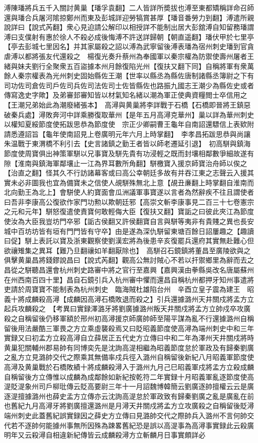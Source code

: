 溥陳璠將兵五千入關討黄巢【璠孚袁翻】二人皆詳所奬拔也溥至東都矯稱詳命召師還與璠合兵屠河隂掠鄭州而東及彭城詳迎勞犒賞甚厚【璠音番勞力到翻】溥遣所親說詳曰【說式芮翻】衆心見迫請公解印以相授詳不能制出居大彭舘溥自知留務璠謂溥曰支僕射有惠於徐人不殺必成後悔溥不許送詳歸朝【朝直遥翻】璠伏甲於七里亭【亭去彭城七里因名】并其家屬殺之詔以溥為武寧留後溥表璠為宿州刺史璠到官貪虐溥以都將張友代還殺之　楊復光奏升蔡州為奉國軍以秦宗權為防禦使壽州屠者王緒與妹夫劉行全聚衆五百盜據本州月餘復陷光州【復扶又翻下同】自稱將軍有衆萬餘人秦宗權表為光州刺史固始縣佐王潮【世率以縣丞為縣佐唐制諸縣丞簿尉之下有司功佐司倉佐司戶佐司兵佐司法佐司士佐皆縣佐也路振九國志王潮少為縣佐史或者傳寫逸史字歟】及弟審邽審知皆以材氣知名緒以潮為軍正使典資糧閲士卒信用之【王潮兄弟始此為潮廢緒張本】　高潯與黄巢將李詳戰于石橋【石橋即晉將王鎮惡破秦兵處】潯敗奔河中詳乘勝復取華州【是年五月高潯克華州】巢以詳為華州刺史　以權知夏綏節度使拓跋思恭為節度使　宗正少卿嗣曹王龜年自南詔還驃信上表欵附請悉遵詔旨【龜年使南詔見上卷廣明元年六月上時掌翻】　李孝昌拓跋思恭與尚讓朱温戰于東渭橋不利引去【史言諸鎮之勤王者皆以師老遷延引退】　初高駢與鎮海節度使周寶俱出神策軍駢以兄事寶及駢先貴有功浸輕之既而封壤相鄰數爭細故遂有隙【淮南與鎮海軍鄰壤止一江為界耳數所角翻】駢檄寶入援京師寶治舟師以俟之【治直之翻】怪其久不行訪諸幕客或曰高公幸朝廷多故有并吞江東之志聲云入援其實未必非圖我也宜為備寶未之信使人覘駢殊無北上意【覘丑亷翻上時掌翻自淮南而北向勤王為北上】會駢使人約寶面會瓜洲議軍事寶遂以言者為然辭疾不往且謂使者曰吾非李康高公復欲作家門功勲以欺朝廷邪【高崇文斬李康事見二百三十七卷憲宗之元和元年】駢怒復遣使責寶何敢輕侮大臣【復扶又翻】寶詬之曰彼此夾江為節度使汝為大臣我豈坊門卒邪【詬古侯翻又許侯翻寶自言與駢等夷非有貴賤之異也長安城中百坊坊皆有垣有門門皆有守卒】由是遂為深仇駢留東塘百餘日詔屢趣之【趣讀曰促】駢上表託以寶及浙東觀察使劉漢宏將為後患辛亥復罷兵還府其實無赴難心但欲禳雉集之異耳【難乃旦翻禳如羊翻厭除也】　高駢召石鏡鎮將董昌至廣陵欲與之俱擊黄巢昌將錢鏐說昌曰【說式芮翻】觀高公無討賊心不若以扞禦鄉里為辭而去之昌從之駢聽昌還會杭州刺史路審中將之官行至嘉興【嘉興漢由拳縣吳改名唐屬蘇州在州西南百四十里】昌自石鏡引兵入杭州審中懼而還昌自稱杭州都押牙知州事遣將吏請於周寶寶不能制表為杭州刺史　臨海賊杜雄陷台州　辛酉立皇子震為建王　昭義十將成麟殺高潯【成麟因高潯石橋敗退而殺之】引兵還據潞州天井關戍將孟方立起兵攻麟殺之　【考異曰實録澤潞牙將劉廣據潞州叛天井關戍將孟方立帥戍卒攻廣殺之自稱留後仍移軍額於邢州初高潯援京師廣帥師至陽平謀為亂不行還據潞州自稱留後用法嚴酷三軍畏之方立乘虛襲殺焉又曰貶昭義節度使高潯為端州刺史中和三年實録又曰初孟方立殺高潯自立薛居正五代史方立傳曰中和二年為澤州天井關戍將時黄巢犯關輔州郡易帥有同博奕先是沈詢高湜相繼為昭義節度怠於軍政及有歸秦劉廣之亂方立見潞帥交代之際乘其無備率戍兵徑入潞州自稱留後新紀八月昭義軍節度使高潯及黄巢戰於石橋敗績十將成麟殺潯入于潞州九月己巳昭義軍戍將孟方立殺成麟自稱留後方立傳惟以成麟為成鄰餘如新紀按乾符二年實録十月昭義軍亂逐節度使高湜貶湜象州司戶柳玭傳云貶高要尉三年十一月詔魏博韓簡云劉廣逐帥擅權云云是廣逐湜擅據潞州也薛史孟方立傳亦云沈詢高湜怠於軍政致有歸秦劉廣之亂是廣亂在前也舊紀九月高潯牙將劉廣擅還潞州是月潯天井關戍將孟方立攻廣殺之自稱留後貶潯端州刺史此蓋舊紀誤實録因之薛史方立傳曰見潞帥交代之際帥兵入潞州不言何帥交代若不逐帥何能據州事無所因殊為踈畧舊紀恐是誤以高湜事為高潯事實録此云殺廣明年又云殺潯自相違新紀傳皆云成麟殺潯方立斬麟月日事實頗詳必